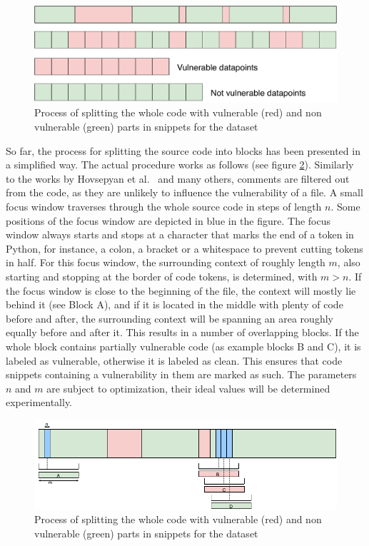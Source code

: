 \documentclass[
a4paper,
pagesize,
pdftex,
12pt,
twoside, %
BCOR=5mm, %
ngerman,
fleqn,
final,
]{scrartcl}
\begin{document}
	\begin{figure}[ht]
		\centering
		\includegraphics[width=0.8\linewidth]{img/collectData2}
		\caption{Process of splitting the whole code with vulnerable (red) and non vulnerable (green) parts in snippets for the dataset}
		\label{fig:collectData2}
	\end{figure}
	
	So far, the process for splitting the source code into blocks has been presented in a simplified way. The actual procedure works as follows (see figure \ref{fig:FocusBlocks}).
	Similarly to the works by Hovsepyan et al.~\cite{Hovsepyan.2012} and many others, comments are filtered out from the code, as they are unlikely to influence the vulnerability of a file. A small focus window traverses through the whole source code in steps of length $n$. Some positions of the focus window are depicted in blue in the figure. The focus window always starts and stops at a character that marks the end of a token in Python, for instance, a colon, a bracket or a whitespace to prevent cutting tokens in half. For this focus window, the surrounding context of roughly length $m$, also starting and stopping at the border of code tokens, is determined, with $m > n$. If the focus window is close to the beginning of the file, the context will mostly lie behind it (see Block A), and if it is located in the middle with plenty of code before and after, the surrounding context will be spanning an area roughly equally before and after it. This results in a number of overlapping blocks. If the whole block contains partially vulnerable code (as example blocks B and C), it is labeled as vulnerable, otherwise it is labeled as clean. This ensures that code snippets containing a vulnerability in them are marked as such. The parameters $n$ and $m$ are subject to optimization, their ideal values will be determined experimentally.
	
	\begin{figure}[ht]
		\centering
		\includegraphics[width=0.9\linewidth]{img/FocusBlocks}
		\caption{Process of splitting the whole code with vulnerable (red) and non vulnerable (green) parts in snippets for the dataset}
		\label{fig:FocusBlocks}
	\end{figure}
	
\end{document}

